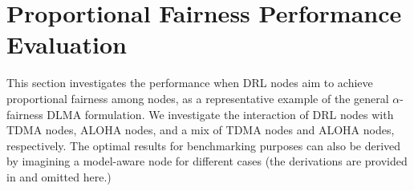 \documentclass[journal,comsoc]{IEEEtran}
\begin{document}


\section{Proportional Fairness Performance Evaluation}\label{exp_pro}
This section investigates the performance when DRL nodes aim to achieve proportional fairness among nodes, as a representative example of the general  $ \alpha $-fairness DLMA formulation. We investigate the interaction of DRL nodes with TDMA nodes, ALOHA nodes, and a mix of TDMA nodes and ALOHA nodes, respectively. The optimal results for benchmarking purposes can also be derived by imagining a model-aware node for different cases (the derivations are provided in \cite{benchmark} and omitted here.) 
\end{document}
